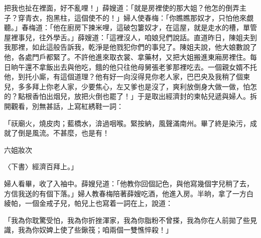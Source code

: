 \begin{showcontents}{}
把我也扯在裡面，好不亂哩！」薛嫂道：「就是房裡使的那大姐？他怎的倒弄主子？穿青衣，抱黑柱，這個使不的！」婦人使春梅：「你瞧瞧那奴才，只怕他來覷聽。」春梅道：「他在廚房下揀米哩，這破包簍奴才，在這屋，就是走水的槽，單管屋裡事兒，往外學舌。」薛嫂道：「這裡沒人，咱娘兒們說話。直道昨日，陳姐夫到我那裡，如此這般告訴我，乾淨是他戮犯你們的事兒了。陳姐夫說，他大娘數說了他，各處門戶都緊了。不許他進來取衣裳、拿藥材，又把大姐搬進東廂房裡住。每日晌午還不拿飯出去與他吃，餓的他只往他母舅張老爹那裡吃去。一個親女婿不托他，到托小廝，有這個道理？他有好一向沒得見你老人家，巴巴央及我稍了個柬兒，多多拜上你老人家，少要焦心，左又爹也是沒了，爽利放倒身大做一做，怕怎的？點根香怕出烟兒，放把火倒也罷了！」于是取出經濟封的柬帖兒遞與婦人。拆開觀看，別無甚話，上寫紅綉鞋一詞：

「祆廟火，燒皮肉；藍橋水，渰過咽喉。緊按納，風聲滿南州。畢了終是染污，成就了倒是風流。不甚麼，也是有！

六姐妝次

〈下書〉經濟百拜上。」

婦人看畢，收了入袖中。薛嫂兒道：「他教你回個記色，與他寫幾個字兒稍了去，方信我送的有個下落。」婦人教春梅陪著薛嫂吃酒，他進入房。半晌，拿了一方白綾帕，一個金戒子兒，帕兒上也寫着一詞在上，說道：

「我為你耽驚受怕，我為你折挫渾家，我為你脂粉不曾搽，我為你在人前拋了些見識，我為你奴婢上使了些鍬筏；咱兩個一雙憔悴殺！」


\end{showcontents}
